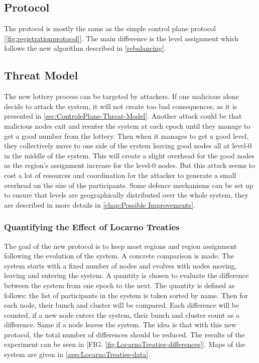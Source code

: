 \documentclass[a4paper,11pt,oneside]{report}
\begin{document}
\subsection{Protocol}
The protocol is mostly the same as the simple control plane protocol
[\autoref{fig:registrationprotocol}]. The main difference is the level
assignment which follows the new algorithm described in \autoref{rebalancing}. 

\subsection{Threat Model}

The new lottery process can be targeted by attackers. If one malicious alone
decide to attack the system, it will not create too bad consequences, as it is
presented in \autoref{sec:ControlePlane-Threat-Model}. Another attack could be
that malicious nodes exit and reenter the system at each epoch until they
manage to get a good number from the lottery. Then when it manages to get a
good level, they collectively move to one side of the system leaving good nodes
all at level-0 in the middle of the system. This will create a slight overhead
for the good nodes as the region’s assignment increase for the level-0 nodes.
But this attack seems to cost a lot of resources and coordination for the
attacker to generate a small overhead on the size of the participants. Some
defence mechanisms can be set up to ensure that levels are geographically
distributed over the whole system, they are described in more details in
\autoref{chap:Possible Improvements}.

\subsubsection{Quantifying the Effect of Locarno Treaties}
The goal of the new protocol is to keep most regions and region assignment
following the evolution of the system. A concrete comparison is made. The
system starts with a fixed number of nodes and evolves with nodes moving,
leaving and entering the system. A quantity is chosen to evaluate the
difference between the system from one epoch to the next. The quantity is
defined as follows: the list of participants in the system is taken sorted by
name. Then for each node, their bunch and cluster will be compared. Each
difference will be counted, if a new node enters the system, their bunch and
cluster count as a difference. Same if a node leaves the system. The idea is
that with this new protocol, the total number of differences should be reduced.
The results of the experiment can be seen in [FIG.
\autoref{fig:LocarnoTreaties-differences}]. Maps of the system are given in
\autoref{app:LocarnoTreaties-data}.
\end{document}
